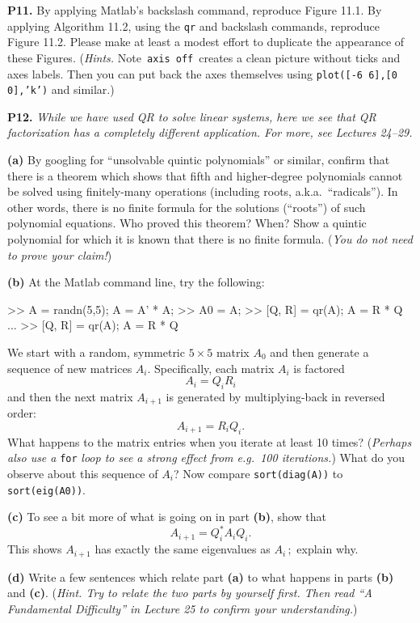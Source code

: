 \documentclass[12pt]{amsart}
\newcommand{\prob}[1]{\bigskip\noindent\textbf{#1.}\quad }
\newcommand{\epart}[1]{\medskip\noindent\textbf{(#1)}\quad }
\begin{document}
\prob{P11}  By applying Matlab's backslash command, reproduce Figure 11.1.  By applying Algorithm 11.2, using the \texttt{qr} and backslash commands, reproduce Figure 11.2.  Please make at least a modest effort to duplicate the appearance of these Figures.  (\emph{Hints.}  Note \,\texttt{axis off}\, creates a clean picture without ticks and axes labels.  Then you can put back the axes themselves using \texttt{plot([-6 6],[0 0],'k')} and similar.)


\prob{P12}  \emph{While we have used QR to solve linear systems, here we see that QR factorization has a completely different application.  For more, see Lectures 24--29.}

\epart{a} By googling for ``unsolvable quintic polynomials'' or similar, confirm that there is a theorem which shows that fifth and higher-degree polynomials cannot be solved using finitely-many operations (including roots, a.k.a.~``radicals'').  In other words, there is no finite formula for the solutions (``roots'') of such polynomial equations.  Who proved this theorem?  When?  Show a quintic polynomial for which it is known that there is no finite formula.  (\emph{You do \emph{not} need to prove your claim!})

\clearpage\newpage
\epart{b} At the Matlab command line, try the following:
\begin{mVerb}
>> A = randn(5,5);  A = A' * A;    %
>> A0 = A;                         %
>> [Q, R] = qr(A);  A = R * Q
...                                %
>> [Q, R] = qr(A);  A = R * Q
\end{mVerb}
We start with a random, symmetric $5\times 5$ matrix $A_0$ and then generate a sequence of new matrices $A_i$.  Specifically, each matrix $A_i$ is factored
    $$A_i = Q_i R_i$$
and then the next matrix $A_{i+1}$ is generated by multiplying-back in reversed order:
    $$A_{i+1} = R_i Q_i.$$
What happens to the matrix entries when you iterate at least 10 times?  (\emph{Perhaps also use a} \texttt{for} \emph{loop to see a strong effect from e.g.~100 iterations.})  What do you observe about this sequence of $A_i$?  Now compare \verb|sort(diag(A))| to \verb|sort(eig(A0))|.

\epart{c} To see a bit more of what is going on in part \textbf{(b)}, show that
    $$A_{i+1} = Q_i^* A_i Q_i.$$
This shows $A_{i+1}$ has exactly the same eigenvalues as $A_i$\,; \,explain why.

\epart{d} Write a few sentences which relate part \textbf{(a)} to what happens in parts \textbf{(b)} and \textbf{(c)}.  (\emph{Hint.  Try to relate the two parts by yourself first.  Then read ``A Fundamental Difficulty'' in Lecture 25 to confirm your understanding.})
\end{document}
